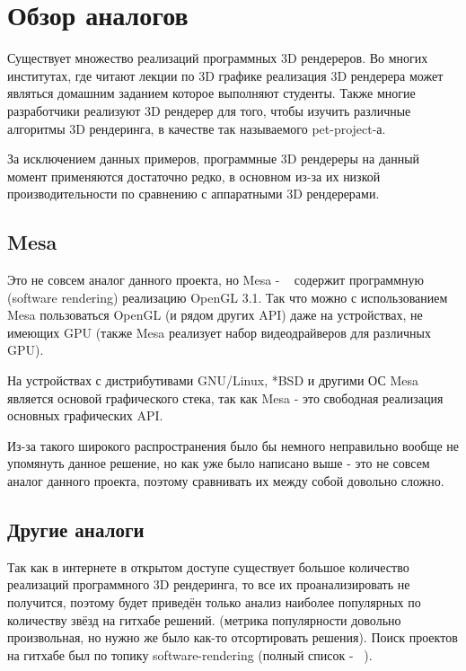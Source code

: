 \documentclass[14pt]{extarticle}
\begin{document}
\section{Обзор аналогов}
Существует множество реализаций программных 3D рендереров. Во многих институтах, где читают лекции по 3D графике реализация 3D рендерера может являться домашним заданием которое выполняют студенты. Также многие разработчики реализуют 3D рендерер для того, чтобы изучить различные алгоритмы 3D рендеринга, в качестве так называемого pet-project-а.

За исключением данных примеров, программные 3D рендереры на данный момент применяются достаточно редко, в основном из-за их низкой производительности по сравнению с аппаратными 3D рендерерами.

\subsection{Mesa}
Это не совсем аналог данного проекта, но Mesa - ~\cite{mesa} содержит программную (software rendering) реализацию OpenGL 3.1. Так что можно с использованием Mesa пользоваться OpenGL (и рядом других API) даже на устройствах, не имеющих GPU (также Mesa реализует набор видеодрайверов для различных GPU).

На устройствах с дистрибутивами GNU/Linux, *BSD и другими ОС Mesa является основой графического стека, так как Mesa - это свободная реализация основных графических API.

Из-за такого широкого распространения было бы немного неправильно вообще не упомянуть данное решение, но как уже было написано выше - это не совсем аналог данного проекта, поэтому сравнивать их между собой довольно сложно.

\subsection{Другие аналоги}
Так как в интернете в открытом доступе существует большое количество реализаций программного 3D рендеринга, то все их проанализировать не получится, поэтому будет приведён только анализ наиболее популярных по количеству звёзд на гитхабе решений. (метрика популярности довольно произвольная, но нужно же было как-то отсортировать решения). Поиск проектов на гитхабе был по топику software-rendering (полный список - ~\cite{analogsList}).
\end{document}

